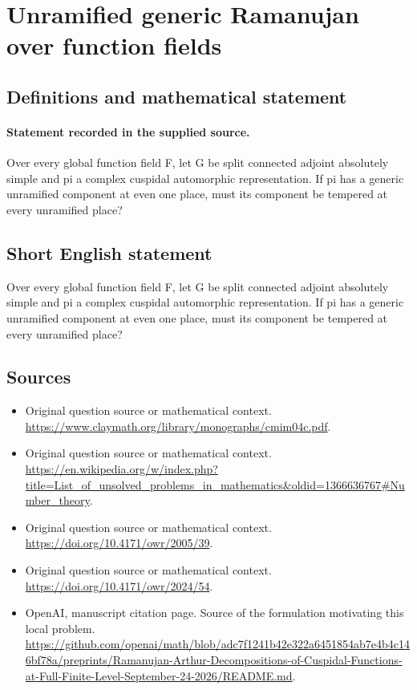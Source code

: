 \documentclass[11pt]{article}
\begin{document}
\section*{Unramified generic Ramanujan over function fields}\label{30007287}
\subsection{Definitions and mathematical statement}
\paragraph{Statement recorded in the supplied source.}
Over every global function field F, let G be split connected adjoint absolutely simple and pi a complex cuspidal automorphic representation. If pi has a generic unramified component at even one place, must its component be tempered at every unramified place?
\subsection{Short English statement}
Over every global function field F, let G be split connected adjoint absolutely simple and pi a complex cuspidal automorphic representation. If pi has a generic unramified component at even one place, must its component be tempered at every unramified place?
\subsection{Sources}
\begin{itemize}
\item[S1] Original question source or mathematical context.
\url{https://www.claymath.org/library/monographs/cmim04c.pdf}.
\item[S2] Original question source or mathematical context.
\url{https://en.wikipedia.org/w/index.php?title=List_of_unsolved_problems_in_mathematics&oldid=1366636767#Number_theory}.
\item[S3] Original question source or mathematical context.
\url{https://doi.org/10.4171/owr/2005/39}.
\item[S4] Original question source or mathematical context.
\url{https://doi.org/10.4171/owr/2024/54}.
\item[S5] OpenAI, manuscript citation page. Source of the formulation motivating this local problem.
\url{https://github.com/openai/math/blob/adc7f1241b42e322a6451854ab7e4b4c146bf78a/preprints/Ramanujan-Arthur-Decompositions-of-Cuspidal-Functions-at-Full-Finite-Level-September-24-2026/README.md}.
\end{itemize}
\end{document}
